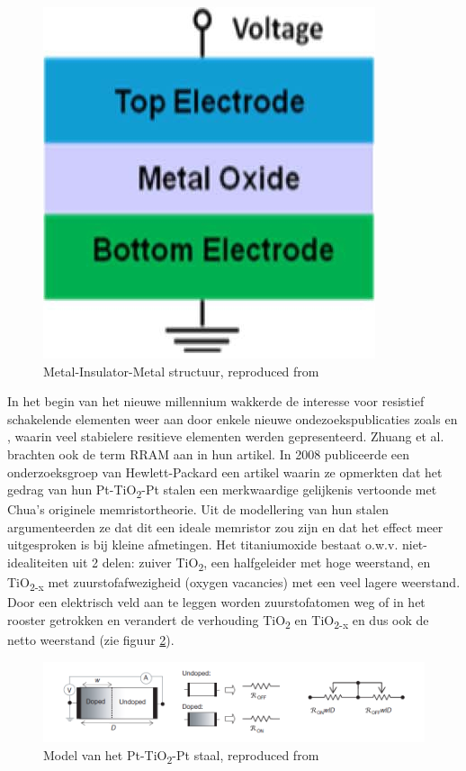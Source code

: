 \begin{figure}[ht!]
  \centering
  \includegraphics[scale=0.35]{../fig/hfdstk-cel-MIM.png}
  \caption[MIM structuur]{Metal-Insulator-Metal structuur, reproduced from\cite{Won12}}
  \label{fig:mim}
\end{figure}

In het begin van het nieuwe millennium wakkerde de interesse voor resistief schakelende elementen weer aan door enkele nieuwe ondezoekspublicaties zoals \cite{Bec00} en \cite{Zhu02}, waarin veel stabielere resitieve elementen werden gepresenteerd. Zhuang et al. brachten ook de term RRAM aan in hun artikel. In 2008 publiceerde een onderzoeksgroep van Hewlett-Packard een artikel waarin ze opmerkten dat het gedrag van hun Pt-TiO\textsubscript{2}-Pt stalen een merkwaardige gelijkenis vertoonde met Chua's originele memristortheorie\cite{Str08}. Uit de modellering van hun stalen argumenteerden ze dat dit een ideale memristor zou zijn en dat het effect meer uitgesproken is bij kleine afmetingen. Het titaniumoxide bestaat o.w.v. niet-idealiteiten uit 2 delen: zuiver TiO\textsubscript{2}, een halfgeleider met hoge weerstand, en TiO\textsubscript{2-x} met zuurstofafwezigheid (oxygen vacancies) met een veel lagere weerstand. Door een elektrisch veld aan te leggen worden zuurstofatomen weg of in het rooster getrokken en verandert de verhouding TiO\textsubscript{2} en TiO\textsubscript{2-x} en dus ook de netto weerstand (zie figuur \ref{fig:HP-model}).

\begin{figure}
  \centering
  \includegraphics[scale=0.5]{../fig/hfdstk-cel-HP-model.png}
  \caption[Model van het Pt-TiO\textsubscript{2}-Pt staal]{Model van het Pt-TiO\textsubscript{2}-Pt staal, reproduced from\cite{Str08}}
  \label{fig:HP-model}
\end{figure}

